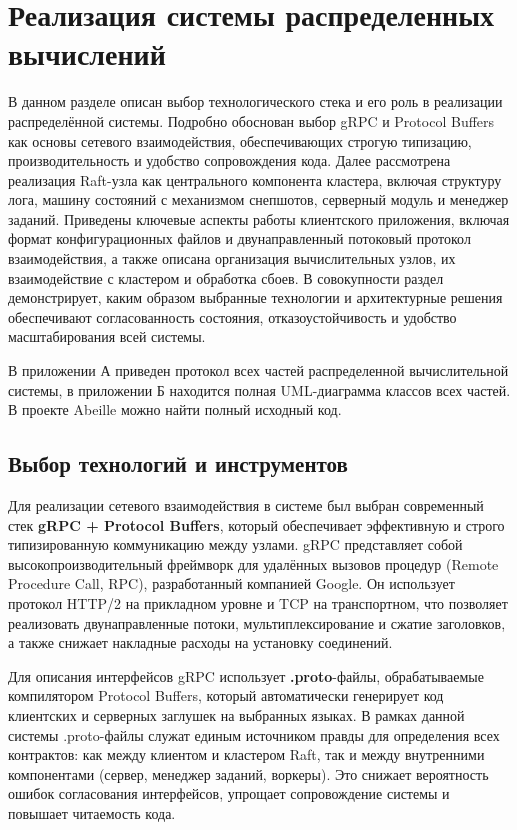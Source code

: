 \section{Реализация системы распределенных вычислений}

В данном разделе описан выбор технологического стека и его роль в реализации
распределённой системы. Подробно обоснован выбор gRPC и Protocol Buffers как
основы сетевого взаимодействия, обеспечивающих строгую типизацию,
производительность и удобство сопровождения кода. Далее рассмотрена реализация
Raft-узла как центрального компонента кластера, включая структуру лога, машину
состояний с механизмом снепшотов, серверный модуль и менеджер заданий.
Приведены ключевые аспекты работы клиентского приложения, включая формат
конфигурационных файлов и двунаправленный потоковый протокол взаимодействия, а
также описана организация вычислительных узлов, их взаимодействие с кластером и
обработка сбоев. В совокупности раздел демонстрирует, каким образом выбранные
технологии и архитектурные решения обеспечивают согласованность состояния,
отказоустойчивость и удобство масштабирования всей системы.

В приложении А приведен протокол всех частей распределенной вычислительной
системы, в приложении Б находится полная UML-диаграмма классов всех частей. В
проекте Abeille \cite{abeille} можно найти полный исходный код.

\subsection{Выбор технологий и инструментов}

Для реализации сетевого взаимодействия в системе был выбран современный
стек \textbf{gRPC + Protocol Buffers}, который обеспечивает эффективную
и строго типизированную коммуникацию между узлами.
gRPC представляет собой высокопроизводительный фреймворк для удалённых
вызовов процедур (Remote Procedure Call, RPC), разработанный компанией Google.
Он использует протокол HTTP/2 на прикладном уровне и TCP на транспортном,
что позволяет реализовать двунаправленные потоки, мультиплексирование
и сжатие заголовков, а также снижает накладные расходы на установку соединений.

Для описания интерфейсов gRPC использует \textbf{.proto}-файлы,
обрабатываемые компилятором Protocol Buffers, который автоматически
генерирует код клиентских и серверных заглушек на выбранных языках.
В рамках данной системы .proto-файлы служат единым источником правды
для определения всех контрактов: как между клиентом и кластером Raft,
так и между внутренними компонентами (сервер, менеджер заданий, воркеры).
Это снижает вероятность ошибок согласования интерфейсов,
упрощает сопровождение системы и повышает читаемость кода.

